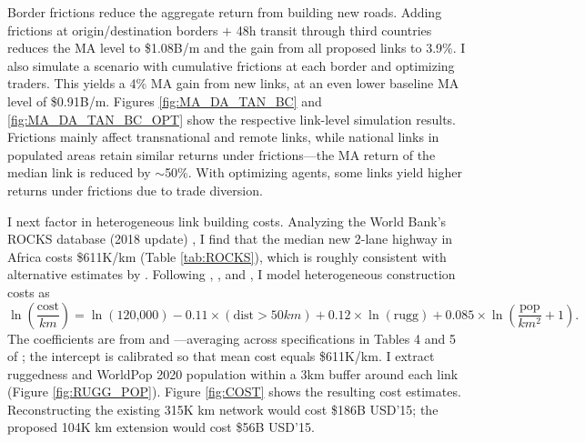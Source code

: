 \documentclass[a4paper]{article}
\begin{document}
Border frictions reduce the aggregate return from building new roads. Adding frictions at origin/destination borders $+$ 48h transit through third countries reduces the MA level to \$1.08B/m and the gain from all proposed links to 3.9\%. I also simulate a scenario with cumulative frictions at each border and optimizing traders. This yields a 4\% MA gain from new links, at an even lower baseline MA level of \$0.91B/m. Figures \ref{fig:MA_DA_TAN_BC} and \ref{fig:MA_DA_TAN_BC_OPT} show the respective link-level simulation results. Frictions mainly affect transnational and remote links, while national links in populated areas retain similar returns under frictions---the MA return of the median link is reduced by $\sim$50\%. With optimizing agents, some links yield higher returns under frictions due to trade diversion. \newline



I next factor in heterogeneous link building costs. Analyzing the World Bank's ROCKS database (2018 update) \citep{collier2016cost, bosio2018road}, I find that the median new 2-lane highway in Africa costs \$611K/km (Table \ref{tab:ROCKS}), which is roughly consistent with alternative estimates by \citet{AfDB2014}. Following \citet{collier2016cost}, \citet{fajgelbaum2020optimal}, and \citet{graff2019spatial}, I model heterogeneous construction costs as 
\begin{equation} \label{eq:COST}
\ln\left(\frac{\text{cost}}{km}\right) = \ln(\text{120,000}) -0.11 \times (\text{dist} > 50km) + 0.12 \times \ln(\text{rugg}) + 0.085 \times \ln\left(\frac{\text{pop}}{km^2}+1\right).
\end{equation}
The coefficients are from \citet{fajgelbaum2020optimal} and \citet{collier2016cost}---averaging across specifications in Tables 4 and 5 of \citet{collier2016cost}; the intercept is calibrated so that mean cost equals \$611K/km. I extract ruggedness \citep{nunn2012ruggedness} and WorldPop 2020 population \citep{tatem2017worldpop} within a 3km buffer around each link (Figure \ref{fig:RUGG_POP}). Figure \ref{fig:COST} shows the resulting cost estimates. Reconstructing the existing 315K km network would cost \$186B USD'15; the proposed 104K km extension would cost \$56B USD'15. \newline


\end{document}
